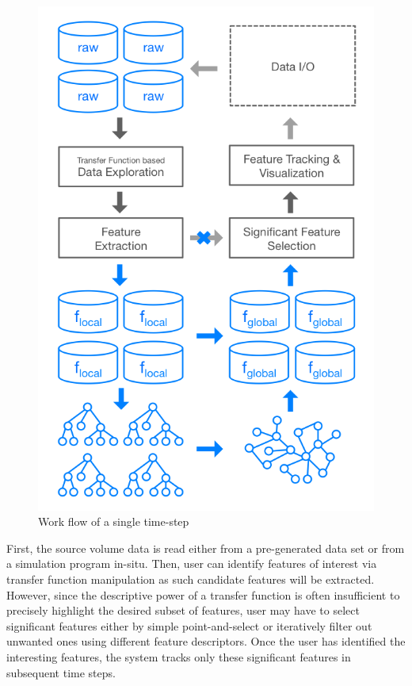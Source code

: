 \documentclass[10pt, conference, compsocconf]{IEEEtran}
\begin{document}
\begin{figure}[ht]
	\centering
	\includegraphics[width=1\linewidth]{system_overview.png}
	\caption{Work flow of a single time-step}
	\label{fig:system-overview}
\end{figure}

First, the source volume data is read either from a pre-generated data set or from a simulation program in-situ. Then, user can identify features of interest via transfer function manipulation as such candidate features will be extracted. However, since the descriptive power of a transfer function is often insufficient to precisely highlight the desired subset of features, user may have to select significant features either by simple point-and-select or iteratively filter out unwanted ones using different feature descriptors. Once the user has identified the interesting features, the system tracks only these significant features in subsequent time steps.
\end{document}
